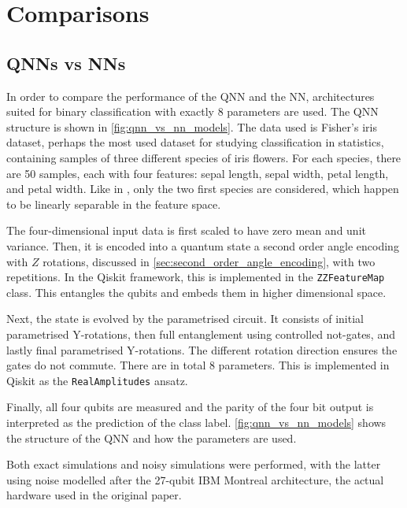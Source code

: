 \section{Comparisons}
\subsection{QNNs vs NNs}
\label{sec:qnn-vs-nn}

In order to compare the performance of the QNN and the NN, architectures suited for binary classification with exactly 8 parameters are used.
The QNN structure is shown in \cref{fig:qnn_vs_nn_models}.
The data used is Fisher's iris dataset, perhaps the most used dataset for studying classification in statistics, containing samples of three different species of iris flowers.
For each species, there are 50 samples, each with four features: sepal length, sepal width, petal length, and petal width.
Like in \cite{abbas2021}, only the two first species are considered, which happen to be linearly separable in the feature space.

The four-dimensional input data is first scaled to have zero mean and unit variance.
Then, it is encoded into a quantum state a second order angle encoding with $Z$ rotations, discussed in \cref{sec:second_order_angle_encoding}, with two repetitions.
In the Qiskit framework, this is implemented in the \texttt{ZZFeatureMap} class.
This entangles the qubits and embeds them in higher dimensional space.

Next, the state is evolved by the parametrised circuit.
It consists of initial parametrised Y-rotations, then full entanglement using controlled not-gates, and lastly final parametrised Y-rotations.
The different rotation direction ensures the gates do not commute.
There are in total 8 parameters.
This is implemented in Qiskit as the \texttt{RealAmplitudes} ansatz.

Finally, all four qubits are measured and the parity of the four bit output is interpreted as the prediction of the class label.
\cref{fig:qnn_vs_nn_models} shows the structure of the QNN and how the parameters are used.

Both exact simulations and noisy simulations were performed, with the latter using noise modelled after the 27-qubit IBM Montreal architecture, the actual hardware used in the original paper.

